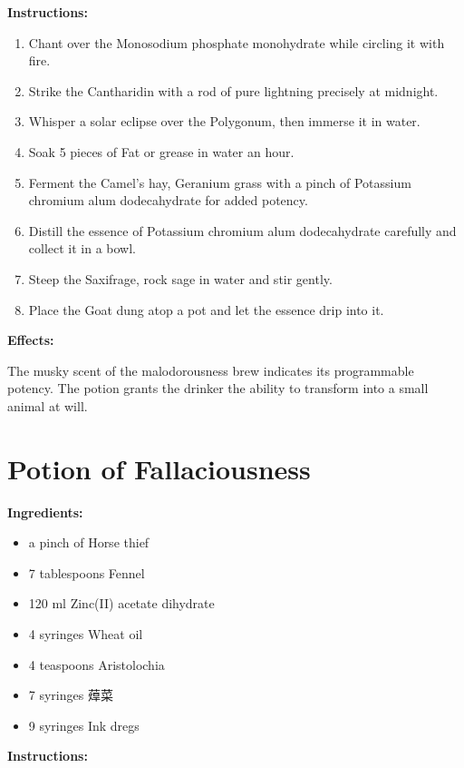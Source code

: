 \documentclass{article}
\begin{document}
\textbf{Instructions:}

\begin{enumerate}
  \item Chant over the Monosodium phosphate monohydrate while circling it with fire.
  \item Strike the Cantharidin with a rod of pure lightning precisely at midnight.
  \item Whisper a solar eclipse over the Polygonum, then immerse it in water.
  \item Soak 5 pieces of Fat or grease in water an hour.
  \item Ferment the Camel's hay, Geranium grass with a pinch of Potassium chromium alum dodecahydrate for added potency.
  \item Distill the essence of Potassium chromium alum dodecahydrate carefully and collect it in a bowl.
  \item Steep the Saxifrage, rock sage in water and stir gently.
  \item Place the Goat dung atop a pot and let the essence drip into it.
\end{enumerate}

\textbf{Effects:}

The musky scent of the malodorousness brew indicates its programmable potency. The potion grants the drinker the ability to transform into a small animal at will.

\newpage
\section*{Potion of Fallaciousness}

\textbf{Ingredients:}

\begin{itemize}
  \item a pinch of Horse thief
  \item 7 tablespoons Fennel
  \item 120 ml Zinc(II) acetate dihydrate
  \item 4 syringes Wheat oil
  \item 4 teaspoons Aristolochia
  \item 7 syringes 蔊菜
  \item 9 syringes Ink dregs
\end{itemize}

\textbf{Instructions:}
\end{document}
